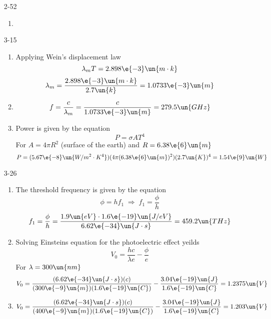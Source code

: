 \documentclass{2620hw}
\begin{document}
\maketitle

\begin{enumerate}
		
\item [2-52]
\begin{enumerate}
	\item 
\end{enumerate}

\item [3-15]
\begin{enumerate}

    \item Applying Wein's displacement law
	\[
		\lambda_m T = 2.898\e{-3}\un{m \cdot k}
	\]
	\[
		\lambda_m = \frac{2.898\e{-3}\un{m \cdot k}}{2.7\un{k}} = 1.0733\e{-3}\un{m}
	\]
	
	\item 
	\[
		f = \frac{c}{\lambda_m} = \frac{c}{1.0733\e{-3}\un{m}} = 279.5 \un{GHz}
	\]
	
	\item Power is given by the equation 
	\[
		P = \sigma AT^4
	\]
	For $A = 4\pi R^2$ (surface of the earth) and $R = 6.38\e{6}\un{m}$
	\[
		P =  (5.67\e{-8}\un{W/m^2 \cdot K^4})(4\pi ( 6.38\e{6}\un{m})^2)(2.7\un{K})^4 = 1.54\e{9}\un{W}
	\]

\end{enumerate}

\item [3-26]
\begin{enumerate}

    \item The threshold frequency is given by the equation
	\[
		\phi = hf_1 \; \Rightarrow \; f_1 = \frac{\phi}{h}
	\]
	\[
		 f_1 = \frac{\phi}{h} = \frac{1.9\un{eV} \cdot 1.6\e{-19}\un{J/eV}}{6.62\e{-34}\un{J\cdot s}} = 459.2\un{THz}
	\]
	
	\item
	Solving Einsteins equation for the photoelectric effect yeilds 
	\[
		V_0 = \frac{hc}{\lambda e} - \frac{\phi}{e}
	\]
	For $\lambda = 300\un{nm}$
	\[
		V_0 = \frac{(6.62 \e{-34}\un{J\cdot s}) (c)}{(300 \e{-9}\un{m})(1.6 \e{-19}\un{C})} - \frac{3.04 \e{-19}\un{J}}{1.6 \e{-19}\un{C}} = 1.2375\un{V}
	\]
	\item
	\[
	V_0 = \frac{(6.62 \e{-34}\un{J\cdot s}) (c)}{(400 \e{-9}\un{m})(1.6 \e{-19}\un{C})} - \frac{3.04 \e{-19}\un{J}}{1.6 \e{-19}\un{C}} = 1.203\un{V}
	\]


\end{enumerate}
\end{enumerate}
\end{document}
